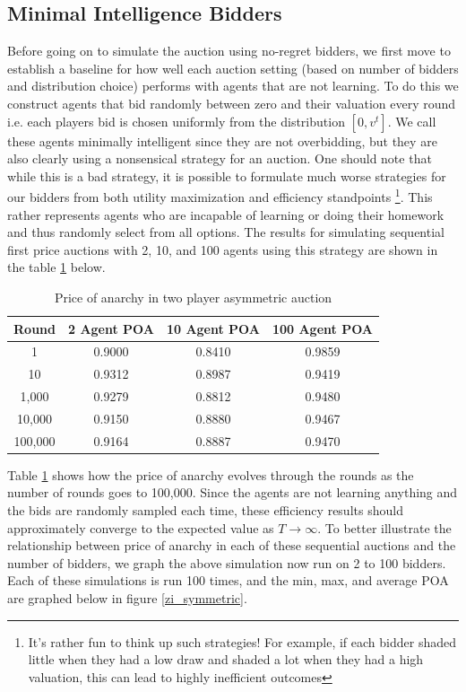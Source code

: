 \documentclass[12pt,twoside]{reedthesis}
\begin{document}
\subsection{Minimal Intelligence Bidders}
Before going on to simulate the auction using no-regret bidders, we first move to establish a baseline for how well each auction setting (based on number of bidders and distribution choice) performs with agents that are not learning. To do this we construct agents that bid randomly between zero and their valuation every round i.e. each players bid is chosen uniformly from the distribution $[0,v^t]$. We call these agents minimally intelligent since they are not overbidding, but they are also clearly using a nonsensical strategy for an auction. One should note that while this is a bad strategy, it is possible to formulate much worse strategies for our bidders from both utility maximization and efficiency standpoints \footnote{It's rather fun to think up such strategies! For example, if each bidder shaded little when they had a low draw and shaded a lot when they had a high valuation, this can lead to highly inefficient outcomes}. This rather represents agents who are incapable of learning or doing their homework and thus randomly select from all options. The results for simulating sequential first price auctions with 2, 10, and 100 agents using this strategy are shown in the table \ref{table:zero_int_symmetric} below.

\begin{table}[h!]
	\begin{center}
		\begin{tabular}{ |c|c|c|c| }
			\hline
			Round & 2 Agent POA & 10 Agent POA & 100 Agent POA \\
			\hline
			1 & 0.9000 & 0.8410 & 0.9859\\
			10 & 0.9312 & 0.8987 & 0.9419\\
			1,000 & 0.9279 & 0.8812 & 0.9480\\
			10,000 & 0.9150 & 0.8880 & 0.9467\\
			100,000 & 0.9164 & 0.8887 & 0.9470\\
			\hline
		\end{tabular}
		\caption{Price of anarchy in two player asymmetric auction}
		\label{table:zero_int_symmetric}
	\end{center} 
\end{table}

Table \ref{table:zero_int_symmetric} shows how the price of anarchy evolves through the rounds as the number of rounds goes to 100,000. Since the agents are not learning anything and the bids are randomly sampled each time, these efficiency results should approximately converge to the expected value as $T \rightarrow \infty$. To better illustrate the relationship between price of anarchy in each of these sequential auctions and the number of bidders, we graph the above simulation now run on 2 to 100 bidders. Each of these simulations is run 100 times, and the min, max, and average POA are graphed below in figure \ref{zi_symmetric}.
\end{document}
